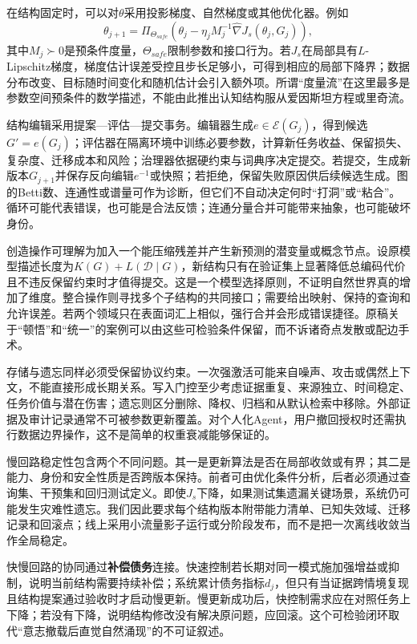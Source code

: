 在结构固定时，可以对$\theta$采用投影梯度、自然梯度或其他优化器。例如
\[
\theta_{j+1}=\Pi_{\Theta_{safe}}\!\left(
\theta_j-\eta_j M_j^{-1}\widehat\nabla J_s(\theta_j,G_j)\right),
\]
其中$M_j\succ0$是预条件度量，$\Theta_{safe}$限制参数和接口行为。若$J_s$在局部具有$L$-Lipschitz梯度，梯度估计误差受控且步长足够小，可得到相应的局部下降界；数据分布改变、目标随时间变化和随机估计会引入额外项。所谓“度量流”在这里最多是参数空间预条件的数学描述，不能由此推出认知结构服从爱因斯坦方程或里奇流。

结构编辑采用提案—评估—提交事务。编辑器生成$e\in\mathcal{E}(G_j)$，得到候选$G'=e(G_j)$；评估器在隔离环境中训练必要参数，计算新任务收益、保留损失、复杂度、迁移成本和风险；治理器依据硬约束与词典序决定提交。若提交，生成新版本$G_{j+1}$并保存反向编辑$e^{-1}$或快照；若拒绝，保留失败原因供后续候选生成。图的Betti数、连通性或谱量可作为诊断，但它们不自动决定何时“打洞”或“粘合”。循环可能代表错误，也可能是合法反馈；连通分量合并可能带来抽象，也可能破坏身份。

创造操作可理解为加入一个能压缩残差并产生新预测的潜变量或概念节点。设原模型描述长度为$K(G)+L(\mathcal{D}\mid G)$，新结构只有在验证集上显著降低总编码代价且不违反保留约束时才值得提交。这是一个模型选择原则，不证明自然世界真的增加了维度。整合操作则寻找多个子结构的共同接口；需要给出映射、保持的查询和允许误差。若两个领域只在表面词汇上相似，强行合并会形成错误捷径。原稿关于“顿悟”和“统一”的案例可以由这些可检验条件保留，而不诉诸奇点发散或配边手术。

存储与遗忘同样必须受保留协议约束。一次强激活可能来自噪声、攻击或偶然上下文，不能直接形成长期关系。写入门控至少考虑证据重复、来源独立、时间稳定、任务价值与潜在伤害；遗忘则区分删除、降权、归档和从默认检索中移除。外部证据及审计记录通常不可被参数更新覆盖。对个人化Agent，用户撤回授权时还需执行数据边界操作，这不是简单的权重衰减能够保证的。

慢回路稳定性包含两个不同问题。其一是更新算法是否在局部收敛或有界；其二是能力、身份和安全性质是否跨版本保持。前者可由优化条件分析，后者必须通过查询集、干预集和回归测试定义。即使$J_s$下降，如果测试集遗漏关键场景，系统仍可能发生灾难性遗忘。我们因此要求每个结构版本附带能力清单、已知失效域、迁移记录和回滚点；线上采用小流量影子运行或分阶段发布，而不是把一次离线收敛当作全局稳定。

快慢回路的协同通过\textbf{补偿债务}连接。快速控制若长期对同一模式施加强增益或抑制，说明当前结构需要持续补偿；系统累计债务指标$d_j$，但只有当证据跨情境复现且结构提案通过验收时才启动慢更新。慢更新成功后，快控制需求应在对照任务上下降；若没有下降，说明结构修改没有解决原问题，应回滚。这个可检验闭环取代“意志撤载后直觉自然涌现”的不可证叙述。

